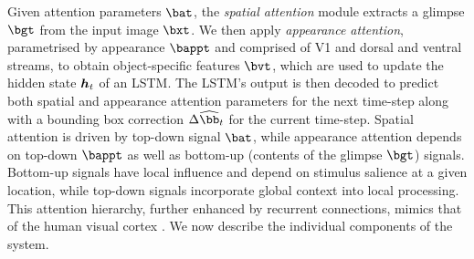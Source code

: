     Given attention parameters $\bat$, the \emph{spatial attention} module extracts a glimpse $\bgt$ from the input image $\bxt$. We then apply \emph{appearance attention}, parametrised by appearance $\bappt$ and comprised of V1 and dorsal and ventral streams, to obtain object-specific features $\bvt$, which are used to update the hidden state $\B{h}_t$ of an LSTM. The LSTM's output is then decoded to predict both spatial and appearance attention parameters for the next time-step along with a bounding box correction $\Delta \widehat{\bb}_t$ for the current time-step.
    Spatial attention is driven by top-down signal $\bat$, while appearance attention depends on top-down $\bappt$ as well as bottom-up (contents of the glimpse $\bgt$) signals. Bottom-up signals have local influence and depend on stimulus salience at a given location, while top-down signals incorporate global context into local processing. This attention hierarchy, further enhanced by recurrent connections, mimics that of the human visual cortex \cite{Ungerleider2000}. We now describe the individual components of the system.
    

